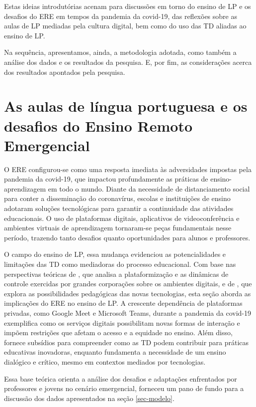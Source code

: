 \documentclass[portuguese]{textolivre}
\begin{document}
Estas ideias introdutórias acenam para discussões em torno do ensino de LP e os desafios do ERE em tempos da pandemia da covid-19, das reflexões sobre as aulas de LP mediadas pela cultura digital, bem como do uso das TD aliadas ao ensino de LP.

Na sequência, apresentamos, ainda, a metodologia adotada, como também a análise dos dados e os resultados da pesquisa. E, por fim, as considerações acerca dos resultados apontados 	pela pesquisa.

\section{As aulas de língua portuguesa e os desafios do Ensino Remoto Emergencial}\label{sec-normas}
O ERE configurou-se como uma resposta imediata às adversidades impostas pela pandemia da covid-19, que impactou profundamente as práticas de ensino-aprendizagem em todo o mundo. Diante da necessidade de distanciamento social para conter a disseminação do coronavírus, escolas e instituições de ensino adotaram soluções tecnológicas para garantir a continuidade das atividades educacionais. O uso de plataformas digitais, aplicativos de videoconferência e ambientes virtuais de aprendizagem tornaram-se peças fundamentais nesse período, trazendo tanto desafios quanto oportunidades para alunos e professores.

O campo do ensino de LP, essa mudança evidenciou as potencialidades e limitações das TD como mediadoras do processo educacional. Com base nas perspectivas teóricas de \textcite{andrea2020pesquisando}, que analisa a plataformização e as dinâmicas de controle exercidas por grandes corporações sobre os ambientes digitais, e de \textcite{coscarelli2016}, que explora as possibilidades pedagógicas das novas tecnologias, esta seção aborda as implicações do ERE no ensino de LP. A crescente dependência de plataformas privadas, como Google Meet e Microsoft Teams, durante a pandemia da covid-19 exemplifica como os serviços digitais possibilitam novas formas de interação e impõem restrições que afetam o acesso e a equidade no ensino. Além disso, \textcite{moran2015} fornece subsídios para compreender como as TD podem contribuir para práticas educativas inovadoras, enquanto \textcite{freire1996pedagogia} fundamenta a necessidade de um ensino dialógico e crítico, mesmo em contextos mediados por tecnologias.

Essa base teórica orienta a análise dos desafios e adaptações enfrentados por professores e jovens no cenário emergencial, forneceu um pano de fundo para a discussão dos dados apresentados na seção \ref{sec-modelo}.
\end{document}
